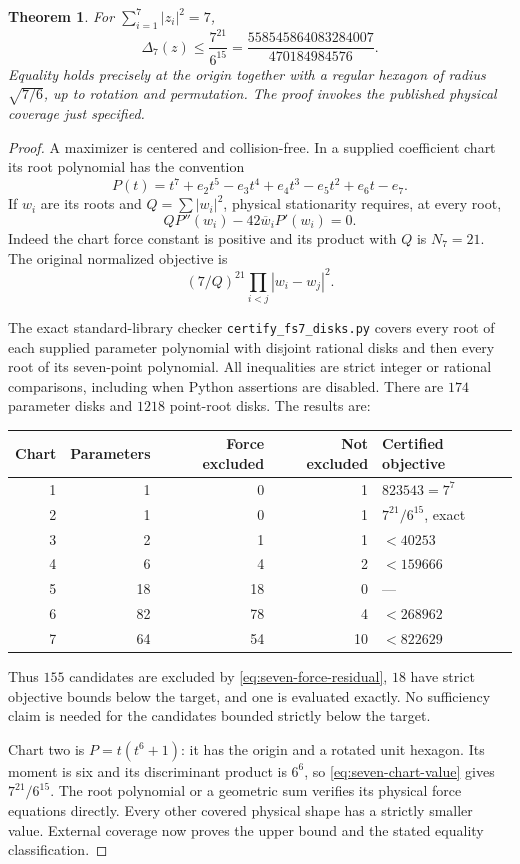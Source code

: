 \documentclass[11pt]{article}
\newtheorem{theorem}{Theorem}[section]
\theoremstyle{remark}
\numberwithin{equation}{section}
\begin{document}
\begin{theorem}\label{thm:seven-global}
For $\sum_{i=1}^7|z_i|^2=7$,
\[
 \Delta_7(z)\le \frac{7^{21}}{6^{15}}
              =\frac{558545864083284007}{470184984576}.
\]
Equality holds precisely at the origin together with a regular
hexagon of radius $\sqrt{7/6}$, up to rotation and permutation.
The proof invokes the published physical coverage just specified.
\end{theorem}
\begin{proof}
A maximizer is centered and collision-free. In a supplied coefficient
chart its root polynomial has the convention
\[
 P(t)=t^7+e_2t^5-e_3t^4+e_4t^3-e_5t^2+e_6t-e_7.
\]
If $w_i$ are its roots and $Q=\sum|w_i|^2$, physical stationarity
requires, at every root,
\begin{equation}\label{eq:seven-force-residual}
                  QP''(w_i)-42\overline w_iP'(w_i)=0.
\end{equation}
Indeed the chart force constant is positive and its product with
$Q$ is $N_7=21$. The original normalized objective is
\begin{equation}\label{eq:seven-chart-value}
             (7/Q)^{21}\prod_{i<j}|w_i-w_j|^2.
\end{equation}

The exact standard-library checker \texttt{certify\_fs7\_disks.py}
covers every root of each supplied parameter polynomial with
disjoint rational disks and then every root of its seven-point
polynomial. All inequalities are strict integer or rational
comparisons, including when Python assertions are disabled.
There are $174$ parameter disks and $1218$ point-root disks.
The results are:
\begin{center}
\begin{tabular}{rrrrl}
\toprule
Chart&Parameters&Force excluded&Not excluded&Certified objective\\
\midrule
1&1&0&1&$823543=7^7$\\
2&1&0&1&$7^{21}/6^{15}$, exact\\
3&2&1&1&$<40253$\\
4&6&4&2&$<159666$\\
5&18&18&0&---\\
6&82&78&4&$<268962$\\
7&64&54&10&$<822629$\\
\bottomrule
\end{tabular}
\end{center}
Thus $155$ candidates are excluded by
\eqref{eq:seven-force-residual}, $18$ have strict objective bounds
below the target, and one is evaluated exactly. No sufficiency
claim is needed for the candidates bounded strictly below the target.

Chart two is $P=t(t^6+1)$: it has the origin and a rotated unit
hexagon. Its moment is six and its discriminant product is $6^6$,
so \eqref{eq:seven-chart-value} gives $7^{21}/6^{15}$.
The root polynomial or a geometric sum verifies its physical force
equations directly. Every other covered physical shape has a
strictly smaller value. External coverage now proves the upper
bound and the stated equality classification.
\end{proof}
\end{document}
